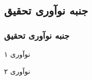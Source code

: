 \label{study_innovations}

\subsection{جنبه نوآوری تحقیق}
\begin{frame}
\frametitle{جنبه نوآوری تحقیق}

\begin{itemize}\raggedleft
\begin{RTLitems}

\item نوآوری ۱
\item نوآوری ۲

\end{RTLitems}
\end{itemize}

\end{frame}
